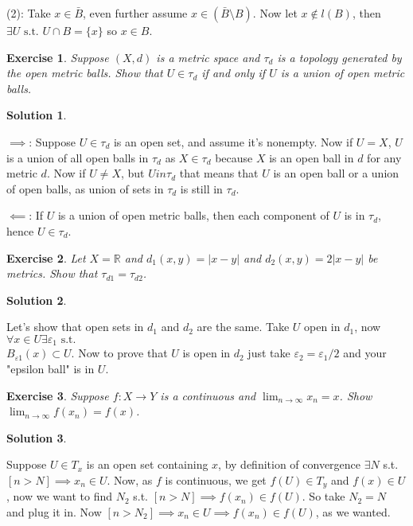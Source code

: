 \documentclass[11pt,a4paper]{article}
\newtheorem{Ex}{Exercise}
\newtheorem{Sol}{Solution}
\begin{document}
\noindent(2): Take $x \in \bar{B}$, even further assume $x \in (\bar{B} \setminus B)$. Now let $x \not\in l(B)$, then $\exists U \text{ s.t. } U\cap B =\{x\}$ so $x \in B$. \\

\begin{Ex}
	Suppose $(X, d)$ is a metric space and $\tau_d$ is a topology generated by the open metric balls. Show that $U \in \tau_d$ if and only if $U$ is a union of open metric balls.
\end{Ex}

\begin{Sol} \end{Sol}
\noindent$\implies$: Suppose $U \in \tau_d$ is an open set, and assume it's nonempty. Now if $U = X$, $U$ is a union of all open balls in $\tau_d$ as $X \in \tau_d$ because $X$ is an open ball in $d$ for any metric $d$. Now if $U \neq X$, but $U in \tau_d$ that means that $U$ is an open ball or a union of open balls, as union of sets in $\tau_d$ is still in $\tau_d$.

$\impliedby$: If $U$ is a union of open metric balls, then each component of $U$ is in $\tau_d$, hence $U \in \tau_d$.

\begin{Ex}
	Let $X = \mathbb{R}$ and $d_1(x,y) = |x-y|$ and $d_2(x,y) = 2|x-y|$ be metrics. Show that $\tau_{d1} = \tau_{d2}$. 
\end{Ex}

\begin{Sol} \end{Sol}
\noindent Let's show that open sets in $d_1$ and $d_2$ are the same. Take $U$ open in $d_1$, now $\forall x \in U \exists \varepsilon_1 \text{ s.t. }$ \\$B_{\varepsilon1}(x) \subset U$. Now to prove that $U$ is open in $d_2$ just take $\varepsilon_2 = \varepsilon_1/2$ and your "epsilon ball" is in $U$. 

\begin{Ex}
	Suppose $f: X \rightarrow Y$ is a continuous and $\lim_{n \rightarrow \infty}x_n = x$. Show $\lim_{n \rightarrow \infty}f(x_n) = f(x)$.
\end{Ex}
\begin{Sol} \end{Sol} 
\noindent Suppose $U \in T_x$ is an open set containing $x$, by definition of convergence $\exists N$ s.t. $[n > N] \implies x_n \in U$. Now, as $f$ is continuous, we get $f(U) \in T_y$ and $f(x) \in U$, now we want to find $N_2$ s.t. $[n > N] \implies f(x_n) \in f(U)$. So take $N_2 = N$ and plug it in. Now $[n > N_2] \implies x_n \in U \implies f(x_n) \in f(U)$, as we wanted. \\
\end{document}

